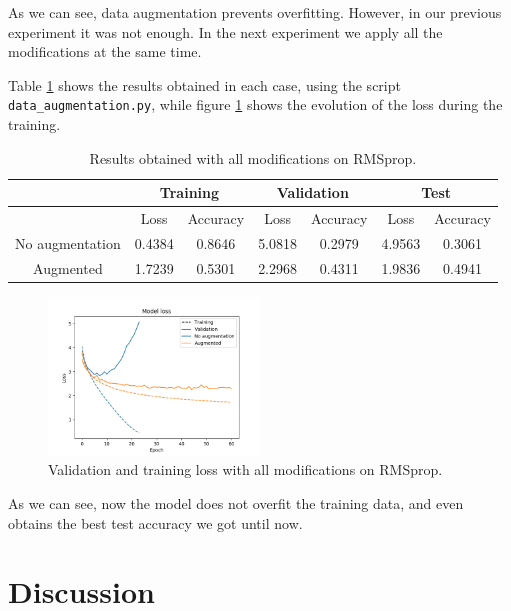 \documentclass[]{article}
\begin{document}
As we can see, data augmentation prevents overfitting. However, in our previous experiment it was not enough. In the next experiment we apply all the modifications at the same time.

Table \ref{t:rms2} shows the results obtained in each case, using the script \texttt{data\_augmentation.py}, while figure \ref{f:rms2} shows the evolution of the loss during the training.

\begin{table}[H]
	\centering
	\label{t:rms2}
	\begin{tabular}{@{}ccccccc@{}}
		\toprule
		& \multicolumn{2}{c}{Training} & \multicolumn{2}{c}{Validation} & \multicolumn{2}{c}{Test} \\ \midrule
		& Loss         & Accuracy      & Loss          & Accuracy       & Loss       & Accuracy    \\
		\midrule
		No augmentation & 0.4384       & 0.8646        & 5.0818        & 0.2979         & 4.9563     & 0.3061      \\
		Augmented       & 1.7239       & 0.5301        & 2.2968        & 0.4311         & 1.9836     & 0.4941      \\ \bottomrule
	\end{tabular}
	\caption{Results obtained with all modifications on RMSprop.}
\end{table}

\begin{figure}[H]
	\centering
	\includegraphics[width=0.5\textwidth]{last2_loss}
	\caption{Validation and training loss with all modifications on RMSprop.}
	\label{f:rms2}
\end{figure}

As we can see, now the model does not overfit the training data, and even obtains the best test accuracy we got until now.

\section{Discussion}
\end{document}
